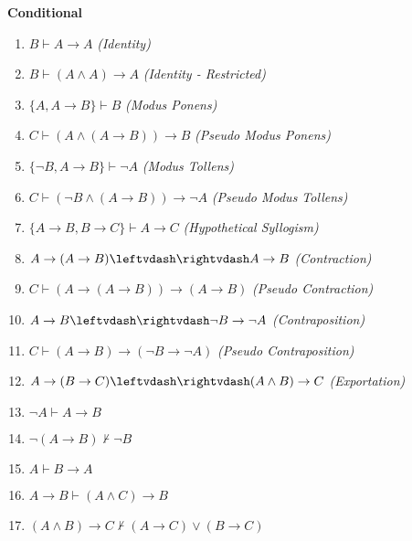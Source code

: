 \begin{singlespace}

\noindent \textbf{Conditional}

\begin{enumerate}
\setcounter{enumi}{\value{enumi_saved}}
\item $ B\vdash  A \rightarrow  A $\hfill\emph{ (Identity)}  
\item $ B\vdash  (A \wedge  A) \rightarrow  A $\hfill\emph{ (Identity - Restricted)}  
\item $ \{A, A \rightarrow  B \} \vdash  B $\hfill\emph{ (Modus Ponens)}  
\item $ C\vdash  (A \wedge  (A \rightarrow  B)) \rightarrow  B $\hfill\emph{ (Pseudo Modus Ponens)}  
\item $ \{\neg B, A \rightarrow  B \} \vdash  \neg A $\hfill\emph{ (Modus Tollens)}  
\item $ C\vdash  (\neg B \wedge  (A \rightarrow  B)) \rightarrow  \neg A $\hfill\emph{ (Pseudo Modus Tollens)}  
\item $ \{A \rightarrow  B, B \rightarrow  C \} \vdash  A \rightarrow  C $\hfill\emph{ (Hypothetical Syllogism)}  
\item $ A \rightarrow  (A \rightarrow  B)\leftvdash\rightvdash  A \rightarrow  B $ \hfill\emph{ (Contraction)}  
\item $ C\vdash  (A \rightarrow  (A \rightarrow  B)) \rightarrow  (A \rightarrow  B) $\hfill\emph{ (Pseudo Contraction)}  
\item $ A \rightarrow  B\leftvdash\rightvdash  \neg B \rightarrow  \neg A $ \hfill\emph{ (Contraposition)}  
\item $ C\vdash  (A \rightarrow  B) \rightarrow  (\neg B \rightarrow  \neg A) $\hfill\emph{ (Pseudo Contraposition)}  
\item $ A \rightarrow  (B \rightarrow  C)\leftvdash\rightvdash  (A \wedge  B) \rightarrow  C $ \hfill\emph{ (Exportation)}  
\item $ \neg A\vdash  A \rightarrow  B $\hfill\emph{ }  
\item $ \neg (A \rightarrow  B)\nvdash  \neg B $\hfill\emph{ }  
\item $ A\vdash  B \rightarrow  A $\hfill\emph{ }  
\item $ A \rightarrow  B\vdash  (A \wedge  C) \rightarrow  B $\hfill\emph{ }  
\item $ (A \wedge  B) \rightarrow  C\nvdash  (A \rightarrow  C) \vee  (B \rightarrow  C) $\hfill\emph{ }  
\setcounter{enumi_saved}{\value{enumi}}
\end{enumerate}



\end{singlespace}
